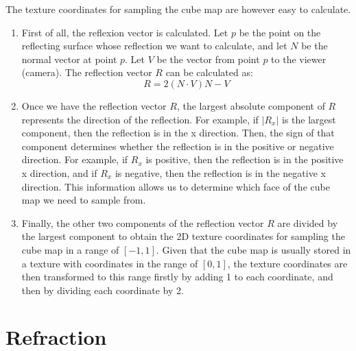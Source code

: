 The texture coordinates for sampling the cube map are however easy to calculate.
\begin{enumerate}
    \item First of all, the reflexion vector is calculated. Let $p$ be the point on the reflecting surface whose reflection we want to calculate, and let $N$ be the normal vector at point $p$. Let $V$ be the vector from point $p$ to the viewer (camera). The reflection vector $R$ can be calculated as:
\begin{equation*}
    R = 2(N \cdot V)N - V
\end{equation*}

    \item Once we have the reflection vector $R$, the largest absolute component of $R$ represents the direction of the reflection. For example, if $|R_x|$ is the largest component, then the reflection is in the x direction. Then, the sign of that component determines whether the reflection is in the positive or negative direction. For example, if $R_x$ is positive, then the reflection is in the positive x direction, and if $R_x$ is negative, then the reflection is in the negative x direction. This information allows us to determine which face of the cube map we need to sample from.
    
    \item Finally, the other two components of the reflection vector $R$ are divided by the largest component to obtain the 2D texture coordinates for sampling the cube map in a range of $[-1, 1]$. Given that the cube map is usually stored in a texture with coordinates in the range of $[0, 1]$, the texture coordinates are then transformed to this range firstly by adding 1 to each coordinate, and then by dividing each coordinate by 2.
\end{enumerate}

\section{Refraction}


